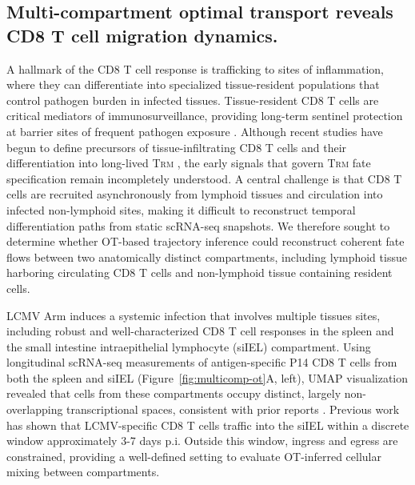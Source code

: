 \subsection{Multi-compartment optimal transport reveals CD8 T cell migration dynamics.}

A hallmark of the CD8 T cell response is trafficking to sites of inflammation, where they can differentiate into specialized tissue-resident populations that control pathogen burden in infected tissues. Tissue-resident CD8 T cells are critical mediators of immunosurveillance, providing long-term sentinel protection at barrier sites of frequent pathogen exposure \citep{masopustTissueResidentCellsOther2019}. Although recent studies have begun to define precursors of tissue-infiltrating CD8 T cells and their differentiation into long-lived T\textsc{rm} \citep{buquicchioDistinctEpigenomicLandscapes2024, greenEnhancerdrivenGeneRegulatory2025, kurdEarlyPrecursorsMolecular2020}, the early signals that govern T\textsc{rm} fate specification remain incompletely understood. A central challenge is that CD8 T cells are recruited asynchronously from lymphoid tissues and circulation into infected non-lymphoid sites, making it difficult to reconstruct temporal differentiation paths from static scRNA-seq snapshots. We therefore sought to determine whether OT-based trajectory inference could reconstruct coherent fate flows between two anatomically distinct compartments, including lymphoid tissue harboring circulating CD8 T cells and non-lymphoid tissue containing resident cells.

LCMV Arm induces a systemic infection that involves multiple tissues sites, including robust and well-characterized CD8 T cell responses in the spleen and the small intestine intraepithelial lymphocyte (siIEL) compartment. Using longitudinal scRNA-seq measurements of antigen-specific P14 CD8 T cells from both the spleen and siIEL (Figure~\ref{fig:multicomp-ot}A, left), UMAP visualization revealed that cells from these compartments occupy distinct, largely non-overlapping transcriptional spaces, consistent with prior reports \citep{kurdEarlyPrecursorsMolecular2020, milnerHeterogenousPopulationsTissueResident2020}. Previous work has shown that LCMV-specific CD8 T cells traffic into the siIEL within a discrete window approximately 3-7 days p.i. \citep{masopustDynamicCellMigration2010} Outside this window, ingress and egress are constrained, providing a well-defined setting to evaluate OT-inferred cellular mixing between compartments.

